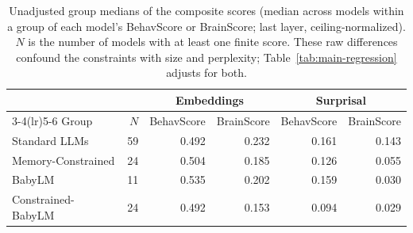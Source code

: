 \begin{table}[t]
\centering
\small
\caption{Unadjusted group medians of the composite scores (median across models within a group of each model's BehavScore or BrainScore; last layer, ceiling-normalized). $N$ is the number of models with at least one finite score. These raw differences confound the constraints with size and perplexity; Table~\ref{tab:main-regression} adjusts for both.}
\label{tab:medians}
\begin{tabular}{lrrrrr}
\toprule
& & \multicolumn{2}{c}{Embeddings} & \multicolumn{2}{c}{Surprisal}\\
\cmidrule(lr){3-4}\cmidrule(lr){5-6}
Group & $N$ & BehavScore & BrainScore & BehavScore & BrainScore\\
\midrule
Standard LLMs & 59 & 0.492 & 0.232 & 0.161 & 0.143\\
Memory-Constrained & 24 & 0.504 & 0.185 & 0.126 & 0.055\\
BabyLM & 11 & 0.535 & 0.202 & 0.159 & 0.030\\
Constrained-BabyLM & 24 & 0.492 & 0.153 & 0.094 & 0.029\\
\bottomrule
\end{tabular}
\end{table}
